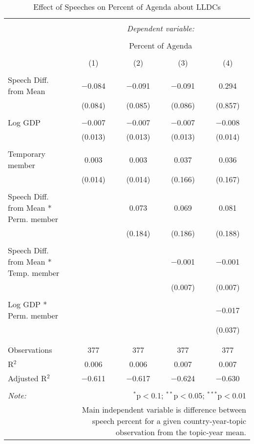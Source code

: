 
\begin{table}[!htbp] \centering 
  \caption{Effect of Speeches on Percent of Agenda about LLDCs} 
  \label{} 
\begin{tabular}{@{\extracolsep{5pt}}lcccc} 
\\[-1.8ex]\hline 
\hline \\[-1.8ex] 
 & \multicolumn{4}{c}{\textit{Dependent variable:}} \\ 
\cline{2-5} 
\\[-1.8ex] & \multicolumn{4}{c}{Percent of Agenda} \\ 
\\[-1.8ex] & (1) & (2) & (3) & (4)\\ 
\hline \\[-1.8ex] 
 Speech Diff. from Mean & $-$0.084 & $-$0.091 & $-$0.091 & 0.294 \\ 
  & (0.084) & (0.085) & (0.086) & (0.857) \\ 
  & & & & \\ 
 Log GDP & $-$0.007 & $-$0.007 & $-$0.007 & $-$0.008 \\ 
  & (0.013) & (0.013) & (0.013) & (0.014) \\ 
  & & & & \\ 
 Temporary member & 0.003 & 0.003 & 0.037 & 0.036 \\ 
  & (0.014) & (0.014) & (0.166) & (0.167) \\ 
  & & & & \\ 
 Speech Diff. from Mean * Perm. member &  & 0.073 & 0.069 & 0.081 \\ 
  &  & (0.184) & (0.186) & (0.188) \\ 
  & & & & \\ 
 Speech Diff. from Mean * Temp. member &  &  & $-$0.001 & $-$0.001 \\ 
  &  &  & (0.007) & (0.007) \\ 
  & & & & \\ 
 Log GDP * Perm. member &  &  &  & $-$0.017 \\ 
  &  &  &  & (0.037) \\ 
  & & & & \\ 
\hline \\[-1.8ex] 
Observations & 377 & 377 & 377 & 377 \\ 
R$^{2}$ & 0.006 & 0.006 & 0.007 & 0.007 \\ 
Adjusted R$^{2}$ & $-$0.611 & $-$0.617 & $-$0.624 & $-$0.630 \\ 
\hline 
\hline \\[-1.8ex] 
\textit{Note:}  & \multicolumn{4}{r}{$^{*}$p$<$0.1; $^{**}$p$<$0.05; $^{***}$p$<$0.01} \\ 
 & \multicolumn{4}{r}{Main independent variable is difference between speech percent for a given country-year-topic observation from the topic-year mean.} \\ 
\end{tabular} 
\end{table} 
